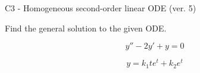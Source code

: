 \begin{exercise}
  \begin{exerciseTitle}C3 - Homogeneous second-order linear ODE (ver. 5)\end{exerciseTitle}
  \begin{exerciseStatement}
    
Find the general solution to the given ODE.

    
\[y''-2y'+y = 0\]

  \end{exerciseStatement}
  \begin{exerciseAnswer}
    
\[y= k_{1} t e^{t} + k_{2} e^{t}\]

  \end{exerciseAnswer}
\end{exercise}